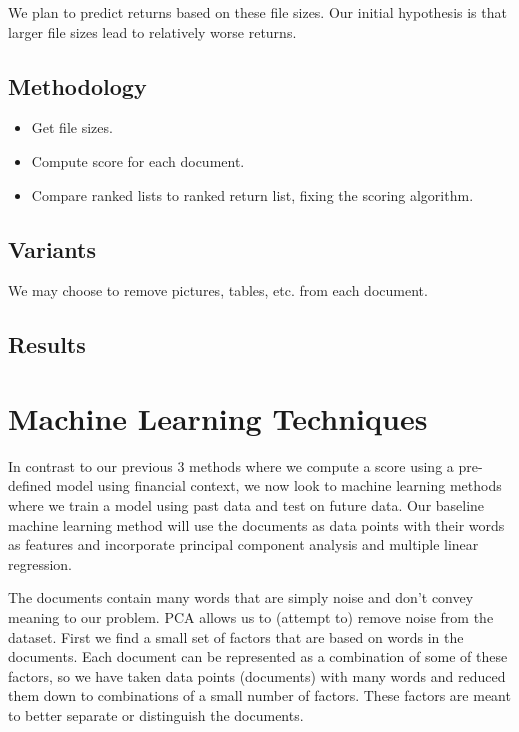\documentclass[12pt]{article}
\begin{document}
We plan to predict returns based on these file sizes. Our initial hypothesis is that larger file sizes lead to relatively worse returns.

\subsection{Methodology}

\begin{itemize}
	\item Get file sizes.
	\item Compute score for each document.
	\item Compare ranked lists to ranked return list, fixing the scoring algorithm. 
\end{itemize}	

\subsection{Variants}

We may choose to remove pictures, tables, etc. from each document.

\subsection{Results}


\section{Machine Learning Techniques}

In contrast to our previous 3 methods where we compute a score using a pre-defined model using financial context, we now look to machine learning methods where we train a model using past data and test on future data. Our baseline machine learning method will use the documents as data points with their words as features and incorporate principal component analysis and multiple linear regression. 

The documents contain many words that are simply noise and don’t convey meaning to our problem. PCA allows us to (attempt to) remove noise from the dataset. First we find a small set of factors that are based on words in the documents. Each document can be represented as a combination of some of these factors, so we have taken data points (documents) with many words and reduced them down to combinations of a small number of factors. These factors are meant to better separate or distinguish the documents.
\end{document}
